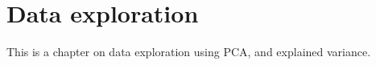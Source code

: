 \chapter{Data exploration}

This is a chapter on data exploration using PCA, and explained variance.
